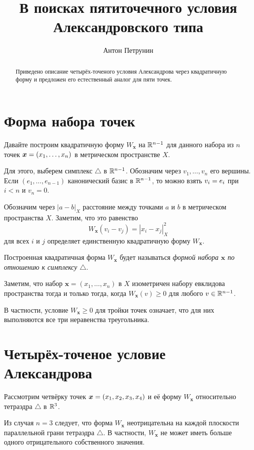 \documentclass{article}
\begin{document}
\title{В поисках пятиточечного условия\\ Александровского типа}
\author{Антон Петрунин}
\date{}
\maketitle
\begin{abstract}
Приведено описание четырёх-точеного условия Александрова через квадратичную форму и предложен его естественный аналог для пяти точек.
\end{abstract}

\section*{Форма набора точек}

Давайте построим квадратичную форму $W_{\bm{x}}$ на $\mathbb{R}^{n-1}$ 
для данного набора из $n$ точек $\bm{x}\z=(x_1,\dots,x_n)$ в метрическом пространстве $X$.

Для этого, выберем симплекс $\triangle$ в $\mathbb{R}^{n-1}$.
Обозначим через $v_1,\dots,v_n$ его вершины.
Если $(e_1,\dots,e_{n-1})$ канонический базис в $\mathbb{R}^{n-1}$,
то можно взять $v_i\z=e_i$ при $i<n$ и $v_n=0$.

Обозначим через $|a-b|_X$ расстояние между точками $a$ и $b$ в метрическом пространства $X$.
Заметим, что это равенство
\[W_{\bm{x}}(v_i-v_j)=|x_i-x_j|^2_X\] 
для всех $i$ и $j$ определяет единственную квадратичную форму $W_{\bm{x}}$.

Построенная квадратичная форма $W_{\bm{x}}$ 
будет называться \emph{формой набора $\bm{x}$ по отношению к симплексу $\triangle$}.

Заметим, что набор $\bm{x}=(x_1,\dots,x_n)$ в $X$ изометричен набору евклидова пространства тогда и только тогда, когда 
$W_{\bm{x}}(v)\ge 0$
для любого $v\in \mathbb{R}^{n-1}$.

В частности, условие $W_{\bm{x}}\ge 0$  для тройки точек означает, что для них
выполняются все три неравенства треугольника. 

\section*{Четырёх-точеное условие Александрова}

Рассмотрим четвёрку точек $\bm{x}\z=(x_1,x_2,x_3,x_4)$ и её форму $W_{\bm{x}}$ относительно тетраэдра $\triangle$ в $\mathbb{R}^3$.


Из случая $n=3$ 
следует, что форма $W_{\bm{x}}$ 
неотрицательна на каждой плоскости параллельной грани тетраэдра $\triangle$.
В частности, $W_{\bm{x}}$ не может иметь больше одного отрицательного собственного значения.
\end{document}
